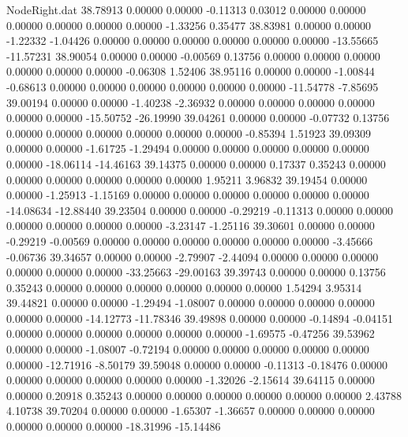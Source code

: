 \begin{filecontents}{NodeRight.dat}
  38.78913    0.00000    0.00000    -0.11313    0.03012    0.00000    0.00000    0.00000    0.00000    0.00000    0.00000   -1.33256    0.35477
  38.83981    0.00000    0.00000    -1.22332   -1.04426    0.00000    0.00000    0.00000    0.00000    0.00000    0.00000  -13.55665  -11.57231
  38.90054    0.00000    0.00000    -0.00569    0.13756    0.00000    0.00000    0.00000    0.00000    0.00000    0.00000   -0.06308    1.52406
  38.95116    0.00000    0.00000    -1.00844   -0.68613    0.00000    0.00000    0.00000    0.00000    0.00000    0.00000  -11.54778   -7.85695
  39.00194    0.00000    0.00000    -1.40238   -2.36932    0.00000    0.00000    0.00000    0.00000    0.00000    0.00000  -15.50752  -26.19990
  39.04261    0.00000    0.00000    -0.07732    0.13756    0.00000    0.00000    0.00000    0.00000    0.00000    0.00000   -0.85394    1.51923
  39.09309    0.00000    0.00000    -1.61725   -1.29494    0.00000    0.00000    0.00000    0.00000    0.00000    0.00000  -18.06114  -14.46163
  39.14375    0.00000    0.00000     0.17337    0.35243    0.00000    0.00000    0.00000    0.00000    0.00000    0.00000    1.95211    3.96832
  39.19454    0.00000    0.00000    -1.25913   -1.15169    0.00000    0.00000    0.00000    0.00000    0.00000    0.00000  -14.08634  -12.88440
  39.23504    0.00000    0.00000    -0.29219   -0.11313    0.00000    0.00000    0.00000    0.00000    0.00000    0.00000   -3.23147   -1.25116
  39.30601    0.00000    0.00000    -0.29219   -0.00569    0.00000    0.00000    0.00000    0.00000    0.00000    0.00000   -3.45666   -0.06736
  39.34657    0.00000    0.00000    -2.79907   -2.44094    0.00000    0.00000    0.00000    0.00000    0.00000    0.00000  -33.25663  -29.00163
  39.39743    0.00000    0.00000     0.13756    0.35243    0.00000    0.00000    0.00000    0.00000    0.00000    0.00000    1.54294    3.95314
  39.44821    0.00000    0.00000    -1.29494   -1.08007    0.00000    0.00000    0.00000    0.00000    0.00000    0.00000  -14.12773  -11.78346
  39.49898    0.00000    0.00000    -0.14894   -0.04151    0.00000    0.00000    0.00000    0.00000    0.00000    0.00000   -1.69575   -0.47256
  39.53962    0.00000    0.00000    -1.08007   -0.72194    0.00000    0.00000    0.00000    0.00000    0.00000    0.00000  -12.71916   -8.50179
  39.59048    0.00000    0.00000    -0.11313   -0.18476    0.00000    0.00000    0.00000    0.00000    0.00000    0.00000   -1.32026   -2.15614
  39.64115    0.00000    0.00000     0.20918    0.35243    0.00000    0.00000    0.00000    0.00000    0.00000    0.00000    2.43788    4.10738
  39.70204    0.00000    0.00000    -1.65307   -1.36657    0.00000    0.00000    0.00000    0.00000    0.00000    0.00000  -18.31996  -15.14486

\end{filecontents}
